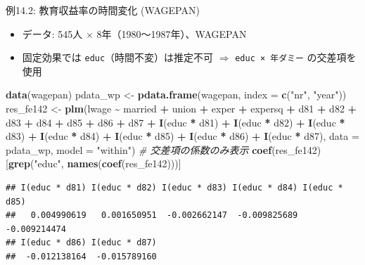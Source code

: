 \documentclass[
  ignorenonframetext,
]{beamer}
\newenvironment{Shaded}{\begin{snugshade}}{\end{snugshade}}
\newcommand{\AttributeTok}[1]{\textcolor[rgb]{0.13,0.29,0.53}{#1}}
\newcommand{\CommentTok}[1]{\textcolor[rgb]{0.56,0.35,0.01}{\textit{#1}}}
\newcommand{\FunctionTok}[1]{\textcolor[rgb]{0.13,0.29,0.53}{\textbf{#1}}}
\newcommand{\NormalTok}[1]{#1}
\newcommand{\OtherTok}[1]{\textcolor[rgb]{0.56,0.35,0.01}{#1}}
\newcommand{\SpecialCharTok}[1]{\textcolor[rgb]{0.81,0.36,0.00}{\textbf{#1}}}
\newcommand{\StringTok}[1]{\textcolor[rgb]{0.31,0.60,0.02}{#1}}
\providecommand{\tightlist}{%
  \setlength{\itemsep}{0pt}\setlength{\parskip}{0pt}}
\begin{document}
\begin{frame}[fragile]{例14.2: 教育収益率の時間変化 (WAGEPAN)}
\label{ux4f8b14.2-ux6559ux80b2ux53ceux76caux7387ux306eux6642ux9593ux5909ux5316-wagepan}
\begin{itemize}
\tightlist
\item
  データ: 545人 × 8年（1980〜1987年）、WAGEPAN
\item
  固定効果では \texttt{educ}（時間不変）は推定不可 \(\Rightarrow\)
  \texttt{educ\ ×\ 年ダミー} の交差項を使用
\end{itemize}

\footnotesize

\begin{Shaded}
\begin{Highlighting}[]
\FunctionTok{data}\NormalTok{(wagepan)}
\NormalTok{pdata\_wp }\OtherTok{\textless{}{-}} \FunctionTok{pdata.frame}\NormalTok{(wagepan, }\AttributeTok{index =} \FunctionTok{c}\NormalTok{(}\StringTok{"nr"}\NormalTok{, }\StringTok{"year"}\NormalTok{))}
\NormalTok{res\_fe142 }\OtherTok{\textless{}{-}} \FunctionTok{plm}\NormalTok{(lwage }\SpecialCharTok{\textasciitilde{}}\NormalTok{ married }\SpecialCharTok{+}\NormalTok{ union }\SpecialCharTok{+}\NormalTok{ exper }\SpecialCharTok{+}\NormalTok{ expersq }\SpecialCharTok{+}
\NormalTok{                   d81 }\SpecialCharTok{+}\NormalTok{ d82 }\SpecialCharTok{+}\NormalTok{ d83 }\SpecialCharTok{+}\NormalTok{ d84 }\SpecialCharTok{+}\NormalTok{ d85 }\SpecialCharTok{+}\NormalTok{ d86 }\SpecialCharTok{+}\NormalTok{ d87 }\SpecialCharTok{+}
                   \FunctionTok{I}\NormalTok{(educ }\SpecialCharTok{*}\NormalTok{ d81) }\SpecialCharTok{+} \FunctionTok{I}\NormalTok{(educ }\SpecialCharTok{*}\NormalTok{ d82) }\SpecialCharTok{+} \FunctionTok{I}\NormalTok{(educ }\SpecialCharTok{*}\NormalTok{ d83) }\SpecialCharTok{+}
                   \FunctionTok{I}\NormalTok{(educ }\SpecialCharTok{*}\NormalTok{ d84) }\SpecialCharTok{+} \FunctionTok{I}\NormalTok{(educ }\SpecialCharTok{*}\NormalTok{ d85) }\SpecialCharTok{+} \FunctionTok{I}\NormalTok{(educ }\SpecialCharTok{*}\NormalTok{ d86) }\SpecialCharTok{+}
                   \FunctionTok{I}\NormalTok{(educ }\SpecialCharTok{*}\NormalTok{ d87),}
                 \AttributeTok{data =}\NormalTok{ pdata\_wp, }\AttributeTok{model =} \StringTok{"within"}\NormalTok{)}
\CommentTok{\# 交差項の係数のみ表示}
\FunctionTok{coef}\NormalTok{(res\_fe142)[}\FunctionTok{grep}\NormalTok{(}\StringTok{"educ"}\NormalTok{, }\FunctionTok{names}\NormalTok{(}\FunctionTok{coef}\NormalTok{(res\_fe142)))]}
\end{Highlighting}
\end{Shaded}

\begin{verbatim}
## I(educ * d81) I(educ * d82) I(educ * d83) I(educ * d84) I(educ * d85) 
##   0.004990619   0.001650951  -0.002662147  -0.009825689  -0.009214474 
## I(educ * d86) I(educ * d87) 
##  -0.012138164  -0.015789160
\end{verbatim}

\normalsize
\end{frame}
\end{document}

